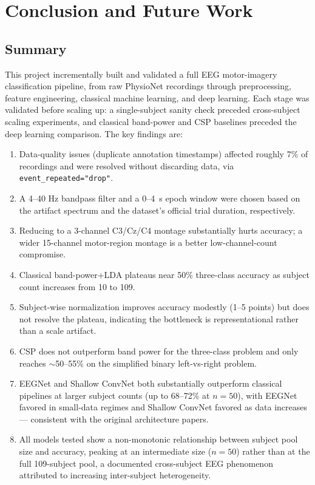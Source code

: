 \documentclass[11pt,a4paper]{article}
\newcommand{\code}[1]{\texttt{#1}}
\begin{document}
\section{Conclusion and Future Work}

\subsection{Summary}
This project incrementally built and validated a full EEG motor-imagery classification pipeline, from raw PhysioNet recordings through preprocessing, feature engineering, classical machine learning, and deep learning. Each stage was validated before scaling up: a single-subject sanity check preceded cross-subject scaling experiments, and classical band-power and CSP baselines preceded the deep learning comparison. The key findings are:

\begin{enumerate}[leftmargin=1.5em]
    \item Data-quality issues (duplicate annotation timestamps) affected roughly 7\% of recordings and were resolved without discarding data, via \code{event\_repeated="drop"}.
    \item A 4--40 Hz bandpass filter and a 0--4~s epoch window were chosen based on the artifact spectrum and the dataset's official trial duration, respectively.
    \item Reducing to a 3-channel C3/Cz/C4 montage substantially hurts accuracy; a wider 15-channel motor-region montage is a better low-channel-count compromise.
    \item Classical band-power+LDA plateaus near 50\% three-class accuracy as subject count increases from 10 to 109.
    \item Subject-wise normalization improves accuracy modestly (1--5 points) but does not resolve the plateau, indicating the bottleneck is representational rather than a scale artifact.
    \item CSP does not outperform band power for the three-class problem and only reaches $\sim$50--55\% on the simplified binary left-vs-right problem.
    \item EEGNet and Shallow ConvNet both substantially outperform classical pipelines at larger subject counts (up to 68--72\% at $n=50$), with EEGNet favored in small-data regimes and Shallow ConvNet favored as data increases --- consistent with the original architecture papers.
    \item All models tested show a non-monotonic relationship between subject pool size and accuracy, peaking at an intermediate size ($n=50$) rather than at the full 109-subject pool, a documented cross-subject EEG phenomenon attributed to increasing inter-subject heterogeneity.
\end{enumerate}
\end{document}
